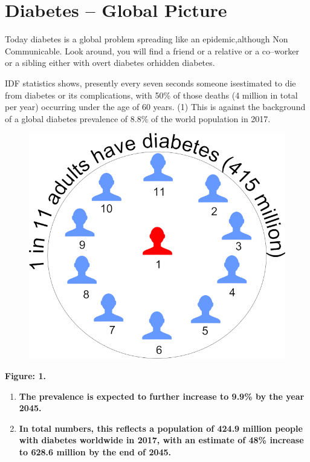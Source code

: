\chapter{Diabetes – Global Picture}\label{chap9}

Today diabetes is a global problem spreading like an epidemic,\break although Non Communicable. Look around, you will find a friend or a relative or a co–worker or a sibling either with overt diabetes or\break hidden diabetes.

IDF statistics shows, presently every seven seconds someone is\break estimated to die from diabetes or its complications, with 50\% of those deaths (4 million in total per year) occurring under the age of 60 years. (1) This is against the background of a global diabetes prevalence of 8.8\% of the world population in 2017.

\begin{figure}[h]
\centering
\includegraphics[scale=1.5]{images/034.jpg}
\end{figure}

\noindent\textbf{Figure: 1.}

\begin{enumerate}
\item \textbf{The prevalence is expected to further increase to 9.9\% by the year 2045.}
 \item \textbf{In total numbers, this reflects a population of 424.9 million people with diabetes worldwide in 2017, with an estimate of 48\% increase to 628.6 million by the end of 2045.}
 \end{enumerate}

